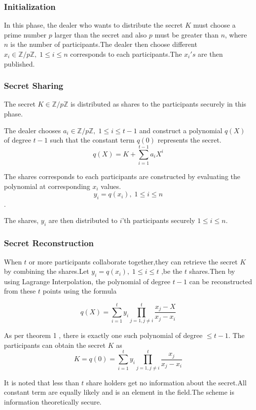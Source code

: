 \documentclass[conference]{IEEEtran}
\begin{document}
\subsubsection{Initialization}
In this phase, the dealer who wants to distribute the secret $K$ must choose a prime number $p$ larger than the secret and also $p$ must be greater than $n$, where $n$ is the number of participants.The dealer then choose different $x_i \in \mathbb{Z}/p\mathbb{Z},\; 1 \le i \le n$ corresponds to each participants.The $x_i's$ are then published.\\
\subsubsection{Secret Sharing}
The secret $K \in \mathbb{Z}/p \mathbb{Z}$ is distributed as shares to the participants securely in this phase.

The dealer chooses $a_i \in \mathbb{Z}/p \mathbb{Z},\; 1 \le i \le t-1$ and construct a polynomial $q(X)$ of degree $t-1$ such that the constant term $q(0)$ represents the secret.
$$ q(X)=K + \sum_{i=1}^{t-1} a_iX^i$$

The shares corresponds to each participants are constructed by evaluating the polynomial at corresponding $x_i$ values.$$y_i=q(x_i), \; 1 \le i \le n$$.

The shares,  $y_i$ are then distributed to $i$'th participants
securely $1 \le i \le n$.

\subsubsection{Secret Reconstruction}

When $t$ or more participants collaborate together,they can retrieve the secret $K$ by combining the shares.Let $y_i=q(x_i),\; 1 \le i \le t$ ,be the $t$ shares.Then by using Lagrange Interpolation, the polynomial of degree $t-1$ can be reconstructed from these $t$ points using the formula 

$$ 	q(X)=\sum\limits_{i=1}^{t}y_i \prod\limits_{j=1,j\ne i}^{t}\frac{x_j-X}{x_j-x_i}$$

As per theorem 1 , there is exactly one such polynomial of degree $\le t-1$. The participants can obtain the secret $K$ as
$$K=q(0)=\sum\limits_{i=1}^{t}y_i \prod\limits_{j=1,j\ne i}^{t}\frac{x_j}{x_j-x_i}$$

It is noted that less than $t$ share holders  get no information about the secret.All constant term are equally likely and is an element in the field.The scheme is information theoretically secure.
\end{document}
